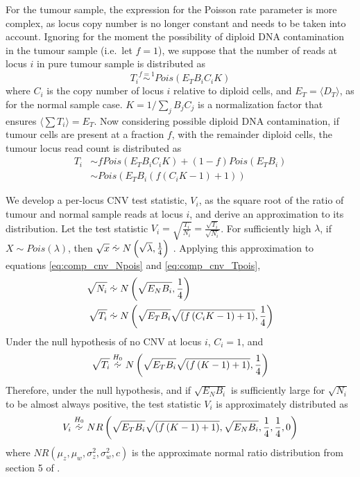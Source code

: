 \documentclass[thesis.tex]{subfiles}
\begin{document}
For the tumour sample, the expression for the Poisson rate parameter is more complex, as locus copy number is no longer constant and needs to be taken into account.  Ignoring for the moment the possibility of diploid DNA contamination in the tumour sample (i.e.\ let $f = 1$), we suppose that the number of reads at locus $i$ in pure tumour sample is distributed as
\begin{equation}
  T_i \overset{f = 1}{\sim} Pois\left(E_T B_i C_i K \right)
\end{equation}
where $C_i$ is the copy number of locus $i$ relative to diploid cells, and $E_T = \langle D_T \rangle$, as for the normal sample case.  $K = 1/\sum_{j} B_j C_j$ is a normalization factor that ensures $\langle \sum T_i \rangle = E_T$.  Now considering possible diploid DNA contamination, if tumour cells are present at a fraction $f$, with the remainder diploid cells, the tumour locus read count is distributed as
\begin{align}
  T_i &\sim f Pois\left(E_T B_i C_i K \right) + (1-f) Pois\left(E_T B_i\right) \\
      &\sim Pois\left(E_T B_i \left( f \left( C_i K - 1 \right) + 1 \right) \right) \label{eq:comp_cnv_Tpois}
\end{align}

We develop a per-locus \gls{CNV} test statistic, $V_i$, as the square root of the ratio of tumour and normal sample reads at locus $i$, and derive an approximation to its distribution.  Let the test statistic $V_i = \sqrt{\frac{T_i}{N_i}} = \frac{\sqrt{T_i}}{\sqrt{N_i}}$.  For sufficiently high $\lambda$, if $X \sim Pois\left(\lambda\right)$, then $\sqrt{x} \approxdist N\left(\sqrt{\lambda}, \frac{1}{4}\right)$ \cite{Bartlett1936}.  Applying this approximation to equations \ref{eq:comp_cnv_Npois} and \ref{eq:comp_cnv_Tpois},
\begin{align}
  \sqrt{N_i} &\approxdist N\left(\sqrt{E_N B_i}, \frac{1}{4}\right) \\
  \sqrt{T_i} &\approxdist N\left(\sqrt{E_T B_i} \sqrt{\left( f \left( C_i K - 1 \right) + 1 \right) }, \frac{1}{4}\right)
\end{align}
Under the null hypothesis of no CNV at locus $i$, $C_i = 1$, and
\begin{equation}
  \sqrt{T_i} \overset{H_0}{\approxdist} N\left(\sqrt{E_T B_i} \sqrt{\left( f \left( K - 1 \right) + 1 \right) }, \frac{1}{4}\right)
\end{equation}
Therefore, under the null hypothesis, and if $\sqrt{E_N B_i}$ is sufficiently large for $\sqrt{N_i}$ to be almost always positive, the test statistic $V_i$ is approximately distributed as
\begin{equation}
  V_i \overset{H_0}{\approxdist} NR \left(\sqrt{E_T B_i}\sqrt{\left( f \left( K - 1 \right) + 1 \right) }, \sqrt{E_N B_i}, \frac{1}{4}, \frac{1}{4}, 0\right)
\end{equation}
where $NR(\mu_z, \mu_w, \sigma_z^2, \sigma_w^2, c)$ is the approximate normal ratio distribution from section 5 of \cite{Marsaglia2006}.
\end{document}
